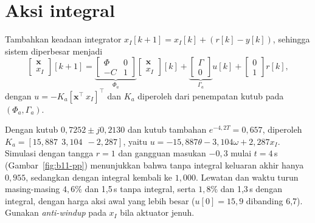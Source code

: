 \section{Aksi integral}
Tambahkan keadaan integrator $x_I[k+1] = x_I[k] + (r[k] - y[k])$, sehingga sistem diperbesar menjadi
\begin{equation}
	\begin{bmatrix}\mathbf{x}\\ x_I\end{bmatrix}[k+1] = \underbrace{\begin{bmatrix}\Phi & 0\\ -C & 1\end{bmatrix}}_{\Phi_a}\begin{bmatrix}\mathbf{x}\\ x_I\end{bmatrix}[k] + \underbrace{\begin{bmatrix}\Gamma\\ 0\end{bmatrix}}_{\Gamma_a}u[k] + \begin{bmatrix}0\\ 1\end{bmatrix}r[k],
\end{equation}
dengan $u = -K_a[\mathbf{x}^\top\ x_I]^\top$ dan $K_a$ diperoleh dari penempatan kutub pada $(\Phi_a, \Gamma_a)$.

\begin{contoh}
	Dengan kutub $0{,}7252 \pm j0{,}2130$ dan kutub tambahan $e^{-4{,}2T} = 0{,}657$, diperoleh $K_a = [15{,}887\ \ 3{,}104\ \ -2{,}287]$, yaitu $u = -15{,}887\theta - 3{,}104\omega + 2{,}287x_I$. Simulasi dengan tangga $r = 1$ dan gangguan masukan $-0{,}3$ mulai $t = 4$\,s (Gambar~\ref{fig:b11-pp}) menunjukkan bahwa tanpa integral keluaran akhir hanya $0{,}955$, sedangkan dengan integral kembali ke $1{,}000$. Lewatan dan waktu turun masing-masing $4{,}6\%$ dan 1,5\,s tanpa integral, serta $1{,}8\%$ dan 1,3\,s dengan integral, dengan harga aksi awal yang lebih besar ($u[0] = 15{,}9$ dibanding 6,7). Gunakan \textit{anti-windup} pada $x_I$ bila aktuator jenuh.
\end{contoh}

